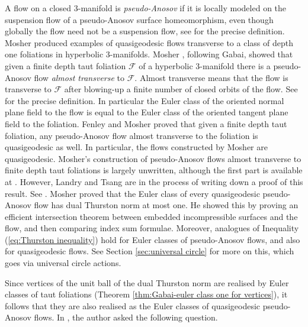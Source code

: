 \documentclass[11pt]{amsart}
\theoremstyle{remark}
\theoremstyle{definition}
\begin{document}
	A flow on a closed 3-manifold is \emph{pseudo-Anosov} if it is locally modeled on the suspension flow of a pseudo-Anosov surface homeomorphism, even though globally the flow need not be a suspension flow, see \cite{mosher1992dynamical} for the precise definition. Mosher \cite{mosher1examples} produced examples of quasigeodesic flows transverse to a class of depth one foliations in hyperbolic 3-manifolds. Mosher \cite{mosher1996laminations}, following Gabai, showed that given a finite depth taut foliation $\mathcal{F}$ of a hyperbolic 3-manifold there is a pseudo-Anosov flow \emph{almost transverse} to $\mathcal{F}$. Almost transverse means that the flow is transverse to $\mathcal{F}$ after blowing-up a finite number of closed orbits of the flow. See \cite[Section 3.5]{mosher1996laminations} for the precise definition. In particular the Euler class of the oriented normal plane field to the flow is equal to the Euler class of the oriented tangent plane field to the foliation. Fenley and Mosher \cite{fenley2001quasigeodesic} proved that given a finite depth taut foliation, any pseudo-Anosov flow almost transverse to the foliation is quasigeodesic as well. In particular, the flows constructed by Mosher \cite{mosher1996laminations} are quasigeodesic. Mosher's construction of pseudo-Anosov flows almost transverse to finite depth taut foliations is largely unwritten, although the first part is available at \cite{mosher1996laminations}. However, Landry and Tsang are in the process of writing down a proof of this result. See \cite{landry2024endperiodic}. Mosher \cite{mosher1992dynamical, mosher1992dynamicalII} proved that the Euler class of every quasigeodesic pseudo-Anosov flow has dual Thurston norm at most one. He showed this by proving an efficient intersection theorem between embedded incompressible surfaces and the flow, and then comparing index sum formulae. Moreover, analogues of Inequality (\ref{eq:Thurston inequality}) hold for Euler classes of pseudo-Anosov flows, and also for quasigeodesic flows. See Section \ref{sec:universal circle} for more on this, which goes via universal circle actions. 
	
	Since vertices of the unit ball of the dual Thurston norm are realised by Euler classes of taut foliations (Theorem \ref{thm:Gabai-euler class one for vertices}), it follows that they are also realised as the Euler classes of quasigeodesic pseudo-Anosov flows.  In \cite{yazdi2020thurston}, the author asked the following question. 
	
\end{document}
